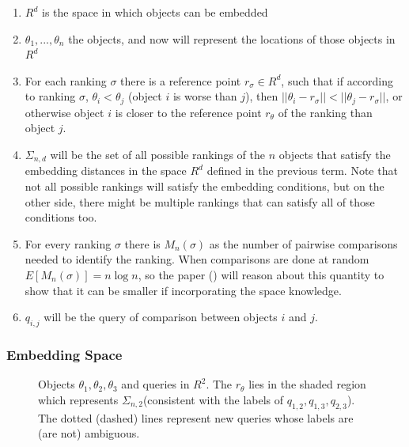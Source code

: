 \documentclass[
  letterpaper,
  numbers=noenddot,
  DIV=11,
  oneside]{scrreprt}
\theoremstyle{remark}
\begin{document}
\begin{enumerate}
\def\labelenumi{\arabic{enumi}.}
\item
  \(R^d\) is the space in which objects can be embedded
\item
  \(\theta_1,...,\theta_n\) the objects, and now will represent the
  locations of those objects in \(R^d\)
\item
  For each ranking \(\sigma\) there is a reference point
  \(r_{\sigma} \in R^d\), such that if according to ranking \(\sigma\),
  \(\theta_{i} < \theta_{j}\) (object \(i\) is worse than \(j\)), then
  \(||\theta_i - r_{\sigma}|| < ||\theta_j - r_{\sigma}||\), or
  otherwise object \(i\) is closer to the reference point \(r_\theta\)
  of the ranking than object \(j\).
\item
  \(\Sigma_{n,d}\) will be the set of all possible rankings of the \(n\)
  objects that satisfy the embedding distances in the space \(R^d\)
  defined in the previous term. Note that not all possible rankings will
  satisfy the embedding conditions, but on the other side, there might
  be multiple rankings that can satisfy all of those conditions too.
\item
  For every ranking \(\sigma\) there is \(M_n(\sigma)\) as the number of
  pairwise comparisons needed to identify the ranking. When comparisons
  are done at random \(E[M_n(\sigma)] = n\log n\), so the paper
  () will reason about this
  quantity to show that it can be smaller if incorporating the space
  knowledge.
\item
  \(q_{i,j}\) will be the query of comparison between objects \(i\) and
  \(j\).
\end{enumerate}

\subsubsection{Embedding Space}\label{embedding-space}

\begin{figure}


\caption{\label{fig-dim-space}Objects \(\theta_1, \theta_2, \theta_3\)
and queries in \(R^2\). The \(r_\theta\) lies in the shaded region which
represents \(\Sigma_{n,2}\)(consistent with the labels of
\(q_{1,2}, q_{1,3}, q_{2,3}\)). The dotted (dashed) lines represent new
queries whose labels are (are not) ambiguous.}

\end{figure}%
\end{document}
